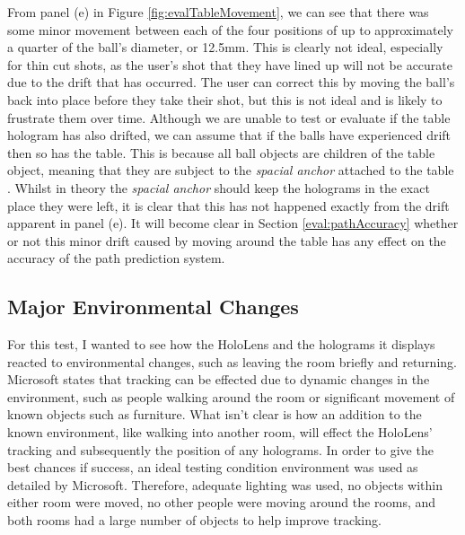 \documentclass[ %
                author={Finn Alexander Wilkinson},
                supervisor={Dr. Andrew Calway},
                degree={MEng},
                title={\centering A Mixed Reality Aim Assistant for Pool and Snooker},
                subtitle={},
                type={Enterprise},
                year={2021} ]{dissertation}
\begin{document}
From panel (e) in Figure \ref{fig:evalTableMovement}, we can see that there was some minor movement between each of the four positions of up to approximately a quarter of the ball's diameter, or 12.5mm. This is clearly not ideal, especially for thin cut shots, as the user's shot that they have lined up will not be accurate due to the drift that has occurred. The user can correct this by moving the ball's back into place before they take their shot, but this is not ideal and is likely to frustrate them over time. Although we are unable to test or evaluate if the table hologram has also drifted, we can assume that if the balls have experienced drift then so has the table. This is because all ball objects are children of the table object, meaning that they are subject to the \textit{spacial anchor} attached to the table \cite{WMRinputAnchors}. Whilst in theory the \textit{spacial anchor} should keep the holograms in the exact place they were left, it is clear that this has not happened exactly from the drift apparent in panel (e). It will become clear in Section \ref{eval:pathAccuracy} whether or not this minor drift caused by moving around the table has any effect on the accuracy of the path prediction system.


\subsection{Major Environmental Changes}
For this test, I wanted to see how the HoloLens and the holograms it displays reacted to environmental changes, such as leaving the room briefly and returning. Microsoft states that tracking can be effected due to dynamic changes in the environment, such as people walking around the room\cite{environmentChangesPeople} or significant movement of known objects such as furniture\cite{environmentChangesfurniture}. What isn't clear is how an addition to the known environment, like walking into another room, will effect the HoloLens' tracking and subsequently the position of any holograms. In order to give the best chances if success, an ideal testing condition environment was used as detailed by Microsoft\cite{hololensEnvironmentConsiderations}. Therefore, adequate lighting was used, no objects within either room were moved, no other people were moving around the rooms, and both rooms had a large number of objects to help improve tracking. 
\end{document}
